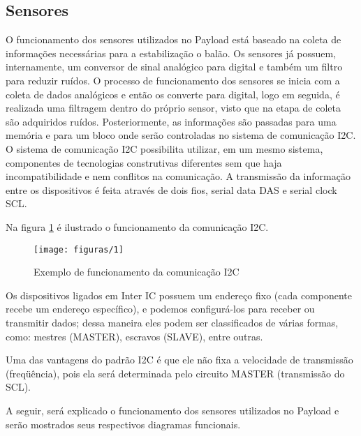 \subsection{Sensores}

O funcionamento dos sensores utilizados no Payload está baseado na coleta de informações necessárias para a estabilização o balão. Os sensores já possuem, internamente, um conversor de sinal analógico para digital e também um filtro para reduzir ruídos. O processo de funcionamento dos sensores se inicia com a coleta de dados analógicos e então os converte para digital, logo em seguida, é realizada uma filtragem dentro do próprio sensor, visto que na etapa de coleta são adquiridos ruídos. Posteriormente, as informações são passadas para uma memória e para um bloco onde serão controladas no sistema de comunicação I2C. O sistema de comunicação I2C possibilita utilizar, em um mesmo sistema, componentes de tecnologias construtivas diferentes sem que haja incompatibilidade e nem conflitos na comunicação. A transmissão da informação entre os dispositivos é feita através de dois fios, serial data DAS e serial clock SCL.

	Na figura \ref{img:funcionamentoI2c} é ilustrado o funcionamento da comunicação I2C.

\begin{figure}[htp]
	\centering
	\caption[Exemplo de funcionamento da comunicação I2C]{Exemplo de funcionamento da comunicação I2C~\cite{microcontrolandos}}
	\label{img:funcionamentoI2c}
	\texttt{[image: figuras/1]}
\end{figure}

Os dispositivos ligados em Inter IC possuem um endereço fixo (cada componente recebe um endereço específico), e podemos configurá-los para receber ou transmitir dados; dessa maneira eles podem ser classificados de várias formas, como: mestres (MASTER), escravos (SLAVE), entre outras.

Uma das vantagens do padrão I2C é que ele não fixa a velocidade de transmissão (freqüência), pois ela será determinada pelo circuito MASTER (transmissão do SCL).

A seguir, será explicado o funcionamento dos sensores utilizados no Payload e serão mostrados seus respectivos diagramas funcionais.

\pagebreak

